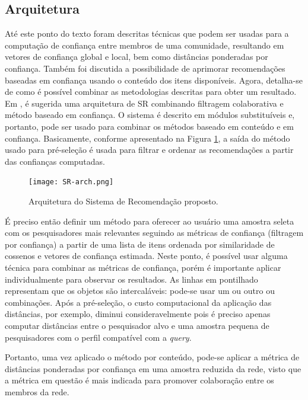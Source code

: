 \documentclass[12pt]{article}
\begin{document}
\subsection{Arquitetura} \label{sect:arch}

Até este ponto do texto foram descritas técnicas que podem ser usadas para a computação de confiança entre membros de uma comunidade, resultando 
em vetores de confiança global e local, bem como distâncias ponderadas por confiança. Também foi discutida a possibilidade de aprimorar recomendações baseadas em confiança usando o conteúdo dos itens disponíveis. Agora, detalha-se de como é possível combinar as metodologias descritas para obter um resultado. Em \cite{massa2004trust}, é sugerida uma arquitetura de SR combinando filtragem colaborativa e método baseado em confiança. O sistema é descrito em módulos substituíveis e, portanto, pode ser usado para combinar os métodos baseado em conteúdo e em confiança. Basicamente, conforme apresentado na Figura \ref{fig:sr-arch}, a saída do método usado para pré-seleção é usada para filtrar e ordenar as recomendações a partir das confianças computadas.

 \begin{figure}[ht]
    \centering
   \texttt{[image: SR-arch.png]}
   \caption{Arquitetura do Sistema de Recomendação proposto.}
   \label{fig:sr-arch}
 \end{figure}


É preciso então definir um método para oferecer ao usuário uma amostra seleta com os pesquisadores mais relevantes seguindo as métricas de confiança (filtragem por confiança) a partir de uma lista de itens ordenada por similaridade de cossenos e vetores de confiança estimada. Neste ponto, é possível usar alguma técnica para combinar as métricas de confiança, porém é importante aplicar individualmente para observar os resultados. As linhas em pontilhado representam que os objetos são intercaláveis: pode-se usar um ou outro ou combinações. Após a pré-seleção, o custo computacional da aplicação das distâncias, por exemplo, diminui consideravelmente pois é preciso apenas computar distâncias entre o pesquisador alvo e uma amostra pequena de pesquisadores com o perfil compatível com a \textit{query}.

Portanto, uma vez aplicado o método por conteúdo, pode-se  aplicar a métrica de distâncias ponderadas por confiança em uma amostra reduzida da rede, visto que a métrica em questão é mais indicada para promover colaboração entre os membros da rede.
\end{document}

